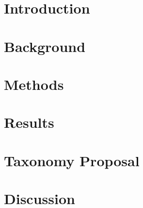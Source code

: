 \documentclass[final,5p,times,twocolumn]{elsarticle}
\begin{document}
\section{Introduction}
\label{intro}


\section{Background}
\label{background}



\section{Methods}
\label{methods}


\section{Results}
\label{results}



\section{Taxonomy Proposal}
\label{Taxonomy-proposal}


\section{Discussion}
\label{Discussion}

\end{document}
